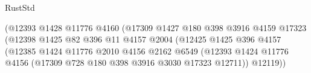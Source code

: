 \begin{lexlean}{RustStd}
\begin{coremodule}
                                                (@12393
                                                  @1428
                                                  @11776
                                                  @4160
                                                  (@17309
                                                    @1427
                                                    @180
                                                    @398
                                                    @3916
                                                    @4159
                                                    @17323
                                                    (@12398
                                                      @1425
                                                      @82
                                                      @396
                                                      @11
                                                      @4157
                                                      @2004
                                                      (@12425
                                                        @1425
                                                        @396
                                                        @4157
                                                        (@12385
                                                          @1424
                                                          @11776
                                                          @2010
                                                          @4156
                                                          @2162
                                                          @6549
                                                          (@12393
                                                            @1424
                                                            @11776
                                                            @4156
                                                            (@17309
                                                              @728
                                                              @180
                                                              @398
                                                              @3916
                                                              @3030
                                                              @17323
                                                              @12711))
                                                          @12119))

\end{coremodule}
\end{lexlean}
